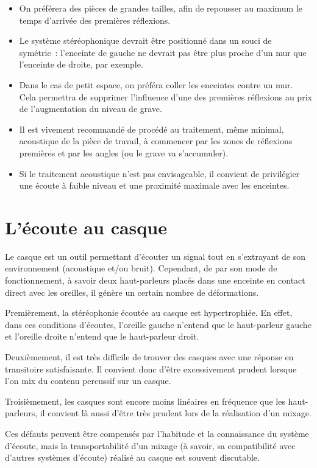 \documentclass[
]{book}
\providecommand{\tightlist}{%
  \setlength{\itemsep}{0pt}\setlength{\parskip}{0pt}}
\begin{document}
\begin{itemize}
\tightlist
\item
  On préférera des pièces de grandes tailles, afin de repousser au maximum le temps d'arrivée des premières réflexions.
\item
  Le système stéréophonique devrait être positionné dans un souci de symétrie~: l'enceinte de gauche ne devrait pas être plus proche d'un mur que l'enceinte de droite, par exemple.
\item
  Dans le cas de petit espace, on préféra coller les enceintes contre un mur. Cela permettra de supprimer l'influence d'une des premières réflexions au prix de l'augmentation du niveau de grave.
\item
  Il est vivement recommandé de procédé au traitement, même minimal, acoustique de la pièce de travail, à commencer par les zones de réflexions premières et par les angles (ou le grave va s'accumuler).
\item
  Si le traitement acoustique n'est pas envisageable, il convient de privilégier une écoute à faible niveau et une proximité maximale avec les enceintes.
\end{itemize}

\hypertarget{luxe9coute-au-casque}{%
\section{L'écoute au casque}\label{luxe9coute-au-casque}}

Le casque est un outil permettant d'écouter un signal tout en s'extrayant de son environnement (acoustique et/ou bruit). Cependant, de par son mode de fonctionnement, à savoir deux haut-parleurs placés dans une enceinte en contact direct avec les oreilles, il génère un certain nombre de déformations.

Premièrement, la stéréophonie écoutée au casque est hypertrophiée. En effet, dans ces conditions d'écoutes, l'oreille gauche n'entend que le haut-parleur gauche et l'oreille droite n'entend que le haut-parleur droit.

Deuxièmement, il est très difficile de trouver des casques avec une réponse en transitoire satisfaisante. Il convient donc d'être excessivement prudent lorsque l'on mix du contenu percussif sur un casque.

Troisièmement, les casques sont encore moins linéaires en fréquence que les haut-parleurs, il convient là aussi d'être très prudent lors de la réalisation d'un mixage.

Ces défauts peuvent être compensés par l'habitude et la connaissance du système d'écoute, mais la transportabilité d'un mixage (à savoir, sa compatibilité avec d'autres systèmes d'écoute) réalisé au casque est souvent discutable.
\end{document}
